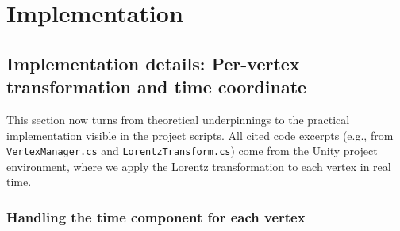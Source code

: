 \documentclass[a4paper]{article}
\begin{document}



\section{Implementation}

\subsection{Implementation details: Per-vertex transformation and time coordinate}
This section now turns from theoretical underpinnings to the practical implementation visible in the project scripts. All cited code excerpts (e.g., from \texttt{VertexManager.cs} and \texttt{LorentzTransform.cs}) come from the Unity project environment, where we apply the Lorentz transformation to each vertex in real time.

\subsubsection{Handling the time component for each vertex}
\end{document}
